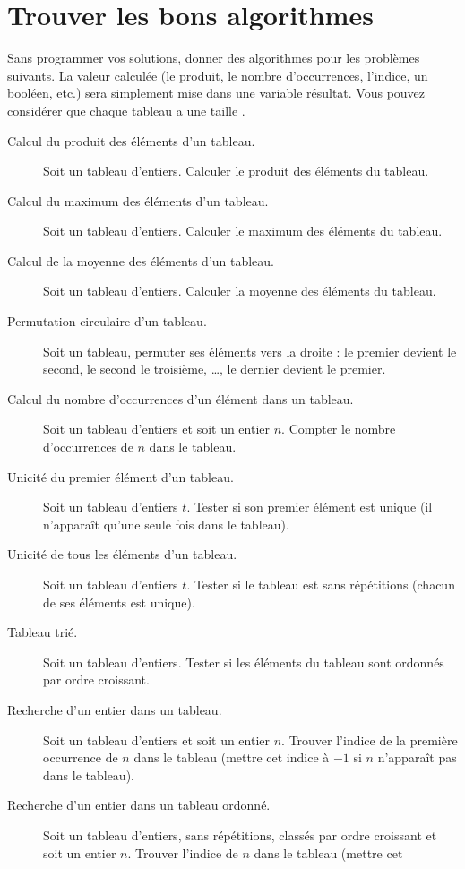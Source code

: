 \section{Trouver les bons algorithmes}
Sans programmer vos solutions, donner des algorithmes pour les
problèmes suivants. La valeur calculée (le produit, le nombre
d'occurrences, l'indice, un booléen, etc.)  sera simplement mise dans une
variable résultat. Vous pouvez considérer que chaque tableau  a
une taille .
\begin{description}
\item[Calcul du produit des éléments d'un tableau.] Soit un tableau
  d'entiers. Calculer le produit des éléments du tableau.
\item[Calcul du maximum des éléments d'un tableau.] Soit un tableau
  d'entiers. Calculer le maximum des éléments du tableau.
\item[Calcul de la moyenne des éléments d'un tableau.] Soit un tableau
  d'entiers. Calculer la moyenne des éléments du tableau.
\item[Permutation circulaire d'un tableau.] Soit un tableau, permuter
  ses éléments vers la droite : le premier devient le second, le
  second le troisième, \ldots, le dernier devient le premier.
\item[Calcul du nombre d'occurrences d'un élément dans un tableau.] Soit
  un tableau d'entiers et soit un entier $n$. Compter le
  nombre d'occurrences de $n$ dans le tableau.
\item[Unicité du premier élément d'un tableau.] Soit
  un tableau d'entiers $t$. Tester si son premier élément est unique
  (il n'apparaît qu'une seule fois dans le tableau).
\item[Unicité de tous les éléments d'un tableau.] Soit
  un tableau d'entiers $t$. Tester si le tableau est sans
  répétitions (chacun de ses éléments est unique). 
\item[Tableau trié.]  Soit un tableau d'entiers. Tester si les
  éléments du tableau sont ordonnés par ordre croissant.
\item[Recherche d'un entier dans un tableau.] Soit
  un tableau d'entiers et soit un entier $n$.  Trouver l'indice
  de la première occurrence  de $n$ dans le tableau (mettre cet
  indice à $-1$ si $n$ n'apparaît pas dans le tableau).
\item[Recherche d'un entier dans un tableau ordonné.] Soit
  un tableau d'entiers, sans répétitions, classés par ordre croissant
  et soit un entier $n$.  Trouver l'indice
  de $n$ dans le tableau (mettre cet

\end{description}
